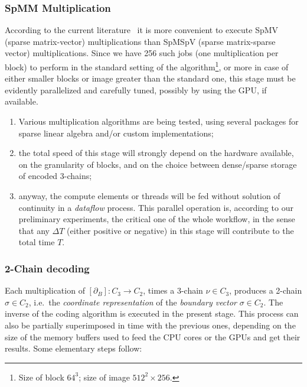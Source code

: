 \documentclass[11pt, oneside]{amsart}   	%
\begin{document}
\subsubsection*{SpMM Multiplication}\label{SpMM-multiplication}
According to the current literature~\cite{} it is more convenient to execute SpMV (sparse matrix-vector) multiplications than SpMSpV (sparse matrix-sparse vector) multiplications. Since we have 256 such jobs (one multiplication per block) to perform in the standard setting of the algorithm\footnote{
Size of block $64^3$; size of image $512^2\times 256$.
}, or more in case of either smaller blocks or image greater than the standard one, this stage must be evidently parallelized and carefully tuned, possibly by using the GPU, if available.
\begin{enumerate}

\item Various multiplication algorithms are being tested, using several packages for sparse linear algebra and/or custom implementations;

\item the total speed of this stage will strongly depend on the hardware available, on the granularity of blocks, and on the choice between dense/sparse storage of encoded 3-chains;

\item anyway, the compute elements or threads will be fed without solution of continuity in a \emph{dataflow} process. This parallel operation is, according to our preliminary experiments, the critical one of the whole workflow, in the sense that any $\Delta T$ (either positive or negative) in this stage will contribute to the total time $T$.

\end{enumerate}

\subsubsection*{2-Chain decoding}\label{sec:two-chain-decoding}
Each multiplication of $[\partial_B] : C_3 \to C_2$, times a 3-chain $\nu\in C_3$, produces a 2-chain  $\sigma\in C_2$, i.e.~the \emph{coordinate representation} of the \emph{boundary vector} $\sigma\in C_2$.  The inverse of the coding algorithm is executed in the present stage.  This process can also be partially superimposed in time with the previous ones, depending on the size of the memory buffers used to feed the CPU cores or the GPUs and get their results. Some elementary steps follow:
\end{document}
